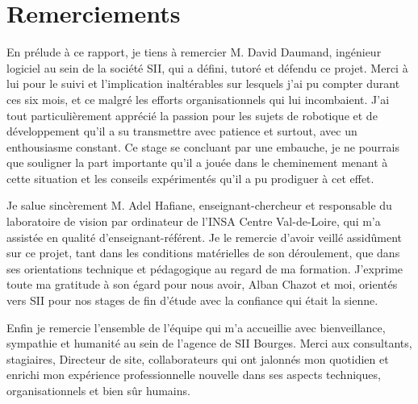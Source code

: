 \chapter*{Remerciements}

En prélude à ce rapport, je tiens à remercier M. David Daumand, ingénieur logiciel au sein de la société \gls{SII}, qui a défini, tutoré et défendu ce projet. 
Merci à lui pour le suivi et l'implication inaltérables sur lesquels j'ai pu compter durant ces six mois, et ce malgré les efforts organisationnels qui lui incombaient.
J'ai tout particulièrement apprécié la passion pour les sujets de robotique et de développement qu'il a su transmettre avec patience et surtout, avec un enthousiasme constant.
Ce stage se concluant par une embauche, je ne pourrais que souligner la part importante qu'il a jouée dans le cheminement menant à cette situation et les conseils expérimentés qu'il a pu prodiguer à cet effet. 

Je salue sincèrement M. Adel Hafiane, enseignant-chercheur et responsable du laboratoire de vision par ordinateur de l'INSA Centre Val-de-Loire, qui m'a assistée en qualité d'enseignant-référent.
Je le remercie d'avoir veillé assidûment sur ce projet, tant dans les conditions matérielles de son déroulement, que dans ses orientations technique et pédagogique au regard de ma formation. 
J'exprime toute ma gratitude à son égard pour nous avoir, Alban Chazot et moi, orientés vers \gls{SII} pour nos stages de fin d'étude avec la confiance qui était la sienne. 

Enfin je remercie l'ensemble de l'équipe qui m'a accueillie avec bienveillance, sympathie et humanité au sein de l'agence de \gls{SII} Bourges. 
Merci aux consultants, stagiaires, Directeur de site, collaborateurs 
qui ont jalonnés mon quotidien et enrichi mon expérience professionnelle nouvelle dans ses aspects techniques, organisationnels et bien sûr humains. 